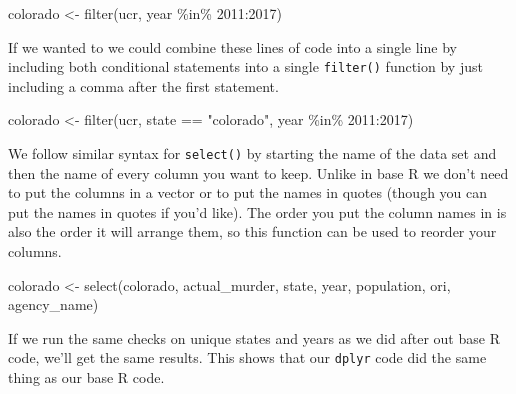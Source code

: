 \documentclass[
]{krantz}
\makeatletter
\newenvironment{Shaded}{\begin{snugshade}}{\end{snugshade}}
\newcommand{\CommentTok}[1]{\textcolor[rgb]{0.37,0.37,0.37}{\textit{#1}}}
\newcommand{\DecValTok}[1]{\textcolor[rgb]{0.06,0.06,0.06}{#1}}
\newcommand{\FunctionTok}[1]{\textcolor[rgb]{0,0,0}{#1}}
\newcommand{\NormalTok}[1]{#1}
\newcommand{\OtherTok}[1]{\textcolor[rgb]{0.37,0.37,0.37}{#1}}
\newcommand{\SpecialCharTok}[1]{\textcolor[rgb]{0,0,0}{#1}}
\newcommand{\StringTok}[1]{\textcolor[rgb]{0.5,0.5,0.5}{#1}}
\newenvironment{kframe}{%
\medskip{}
\setlength{\fboxsep}{.8em}
 \def\at@end@of@kframe{}%
 \ifinner\ifhmode%
  \def\at@end@of@kframe{\end{minipage}}%
  \begin{minipage}{\columnwidth}%
 \fi\fi%
 \def\FrameCommand##1{\hskip\@totalleftmargin \hskip-\fboxsep
 \colorbox{shadecolor}{##1}\hskip-\fboxsep
     \hskip-\linewidth \hskip-\@totalleftmargin \hskip\columnwidth}%
 \MakeFramed {\advance\hsize-\width
   \@totalleftmargin\z@ \linewidth\hsize
   \@setminipage}}%
 {\par\unskip\endMakeFramed%
 \at@end@of@kframe}
\renewenvironment{Shaded}{\begin{kframe}}{\end{kframe}}
\makeatother
\begin{document}
\begin{Shaded}
\begin{Highlighting}[]
\NormalTok{colorado }\OtherTok{\textless{}{-}} \FunctionTok{filter}\NormalTok{(ucr, year }\SpecialCharTok{\%in\%} \DecValTok{2011}\SpecialCharTok{:}\DecValTok{2017}\NormalTok{)}
\end{Highlighting}
\end{Shaded}

If we wanted to we could combine these lines of code into a single line by including both conditional statements into a single \texttt{filter()} function by just including a comma after the first statement.

\begin{Shaded}
\begin{Highlighting}[]
\NormalTok{colorado }\OtherTok{\textless{}{-}} \FunctionTok{filter}\NormalTok{(ucr, state }\SpecialCharTok{==} \StringTok{"colorado"}\NormalTok{, year }\SpecialCharTok{\%in\%} \DecValTok{2011}\SpecialCharTok{:}\DecValTok{2017}\NormalTok{)}
\end{Highlighting}
\end{Shaded}

We follow similar syntax for \texttt{select()} by starting the name of the data set and then the name of every column you want to keep. Unlike in base R we don't need to put the columns in a vector or to put the names in quotes (though you can put the names in quotes if you'd like). The order you put the column names in is also the order it will arrange them, so this function can be used to reorder your columns.

\begin{Shaded}
\begin{Highlighting}[]
\NormalTok{colorado }\OtherTok{\textless{}{-}} \FunctionTok{select}\NormalTok{(colorado, actual\_murder, state, year, population, ori, agency\_name)}
\end{Highlighting}
\end{Shaded}

If we run the same checks on unique states and years as we did after out base R code, we'll get the same results. This shows that our \texttt{dplyr} code did the same thing as our base R code.

\begin{Shaded}
\end{Shaded}
\end{document}
